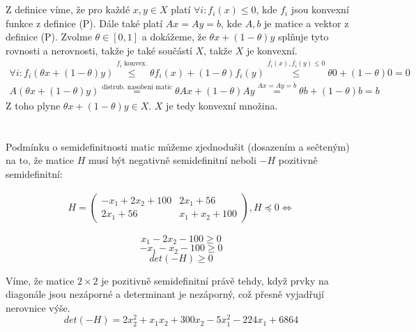 \documentclass[12pt, a4paper]{article}
\begin{document}
\section{}
Z definice  víme, že pro každé $x,y \in X$ platí $\forall i: f_i(x) \leq 0$, kde $f_i$ jsou konvexní funkce z definice (P). Dále také platí $Ax=Ay=b$, kde $A,b$ je matice a vektor z definice (P). Zvolme $\theta \in [0,1]$ a dokážeme, že $\theta x + (1-\theta)y$ splňuje tyto rovnosti a nerovnosti, takže je také součástí $X$, takže $X$ je konvexní.
\begin{gather*}
\forall i: f_i(\theta x + (1-\theta)y) \stackrel{f_i \text{ konvex.}}{\leq} \theta f_i(x) + (1-\theta)f_i(y) \stackrel{f_i(x),f_i(y)\leq 0}{\leq} \theta 0 + (1-\theta)0 = 0\\
A(\theta x + (1-\theta)y)  \stackrel{\text{distrub. nasobeni matic}}{=} \theta Ax + (1-\theta) Ay \stackrel{Ax=Ay=b}{=} \theta b + (1-\theta)b = b
\end{gather*}
Z toho plyne $\theta x + (1-\theta)y \in X$. $X$ je tedy konvexní množina.

\section{}
Podmínku o semidefinitnosti matic můžeme zjednodušit (dosazením a sečteným) na to, že matice $H$ musí být negativně semidefinitní neboli $-H$ pozitivně semidefinitní:\\
\begin{minipage}{.5\linewidth}
\begin{gather*}
H = \begin{pmatrix}
-x_1+2x_2+100 & 2x_1+56\\
2x_1+56 & x_1 + x_2 + 100
\end{pmatrix}, H \preceq 0 \iff
\end{gather*}
\end{minipage}
\begin{minipage}{.5\linewidth}
\begin{equation}
x_1-2x_2-100 \geq 0
\end{equation}
\begin{equation}
-x_1-x_2-100 \geq 0
\end{equation}
\begin{equation}
det(-H) \geq 0
\end{equation}
\end{minipage}

Víme, že matice $2 \times 2$ je pozitivně semidefinitní právě tehdy, když prvky na diagonále jsou nezáporné a determinant je nezáporný, což přesně vyjadřují nerovnice výše.
\[
det(-H) = 2 x_2^2 + x_1x_2 +300x_2 -5x_1^2 -224x_1 +6864
\]
\end{document}
